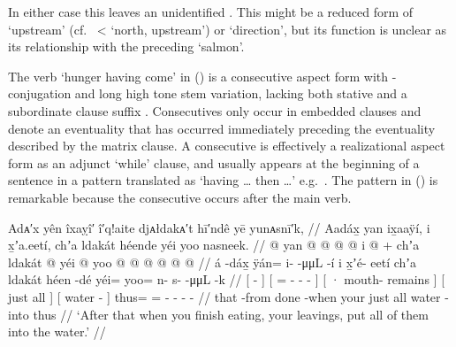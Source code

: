 In either case this leaves an unidentified .
This  might be a reduced form of  ‘upstream’ (cf.\  <  ‘north, upstream’) or  ‘direction’, but its function is unclear as its relationship with the preceding  ‘salmon’.

The verb  ‘hunger having come’ in (\lastx) is a consecutive aspect form with -conjugation and long high tone  stem variation, lacking both stative  and a subordinate clause suffix .
Consecutives only occur in embedded clauses and denote an eventuality that has occurred immediately preceding the eventuality described by the matrix clause.
A consecutive is effectively a realizational aspect form as an adjunct ‘while’ clause, and usually appears at the beginning of a sentence in a pattern translated as ‘having … then …’ e.g.\ .
The pattern in (\lastx) is remarkable because the consecutive occurs after the main verb.

\ex\label{ex:100-65-scraps-in-water}%
%
\begingl
	\glpreamble	Adᴀ′x yên îxaỵî′ î′q!aite djᴀłdakᴀ′t hī′ndê yē yunᴀsnī′k, //
	\glpreamble	Aadáx̱ yan ix̱aaÿí, i x̱ʼa.eetí, chʼa ldakát héende yéi yoo nasneek. //
	\gla	{}  @ {} {}
		{} yan @  @ {} @ {} @ {} {}
		{} i  @ {} {} +
		{} chʼa ldakát {} 
		{}  @ {} {}
		yéi @ yoo @  @ {} @ {} @ {} @ {} @ {} //
	\glb	{} á -dáx̱ {}
		{} ÿán= i-  -μμL -í {}
		{} i x̱ʼé- eetí {}
		{} chʼa ldakát {} 
		{} héen -dé {}
		yéi= yoo= n- {} s-  -μμL -k //
	\glc	{}[  - {}]
		{}[ = -   -\hspace{2em} - {}]
		{}[ · mouth- remains {}]
		{}[ just all {}]
		{}[ water - {}]
		thus= = - \· -  - - //
	\gld	{} that -from {}
		{} done  {} {} -when {}
		{} your  {} {}
		{} just all {} 
		{} water -into {}
		thus   {} {} {} {} {} //
	\glft	‘After that when you finish eating, your leavings, put all of them into the water.’
		//
\endgl
\xe

